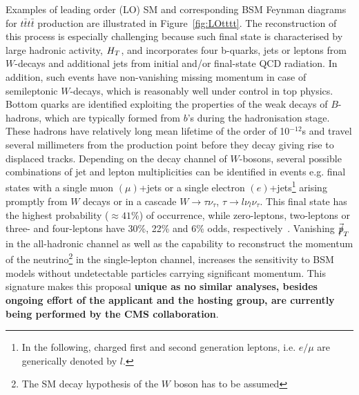 \textcolor{\mycolor}{
Examples of leading order (LO) SM and corresponding BSM Feynman diagrams for $t\bar{t}t\bar{t}$ production are illustrated in Figure~\ref{fig:LOtttt}. The reconstruction of this process is especially challenging because such final state is characterised by large hadronic activity, $\mbox{$H_T$}$, and incorporates four b-quarks, jets or leptons from $W$-decays and additional jets from initial and/or final-state QCD radiation. In addition, such events have non-vanishing missing momentum in case of semileptonic $W$-decays, which is reasonably well under control in top physics. Bottom quarks are identified exploiting the properties of the weak decays of $B$-hadrons, which are typically formed from $b$'s during the hadronisation stage. These hadrons have relatively long mean lifetime of the order of 10$^{-12}$s and travel several millimeters from the production point before they decay giving rise to displaced tracks. Depending on the decay channel of $W$-bosons, several possible combinations of jet and lepton multiplicities can be identified in \fourtop events e.g. final states with a single muon $\left(\mu\right)$+jets or a single electron $\left(e\right)$+jets\footnote{In the following, charged first and second generation leptons, i.e. $e/\mu$ are generically denoted by $l$.} arising promptly from $W$ decays or in a cascade $W\rightarrow\tau\nu_\tau$, $\tau\rightarrow l\nu_l \nu_\tau$. This final state has the highest probability ($\approx 41\%$) of occurrence, while zero-leptons, two-leptons or three- and four-leptons have 30\%, 22\% and 6\% odds, respectively~\cite{Khachatryan:2014sca}. Vanishing $\mbox{$\vec{\slashed{p}}_T$}$ in the all-hadronic channel as well as the capability to reconstruct the momentum of the neutrino\footnote{The SM decay hypothesis of the $W$ boson has to be assumed} in the single-lepton channel, increases the sensitivity to BSM models without undetectable particles carrying significant momentum. This signature makes this proposal \textbf{unique as no similar analyses, besides ongoing effort of the applicant and the hosting group, are currently being performed by the CMS collaboration}.}

